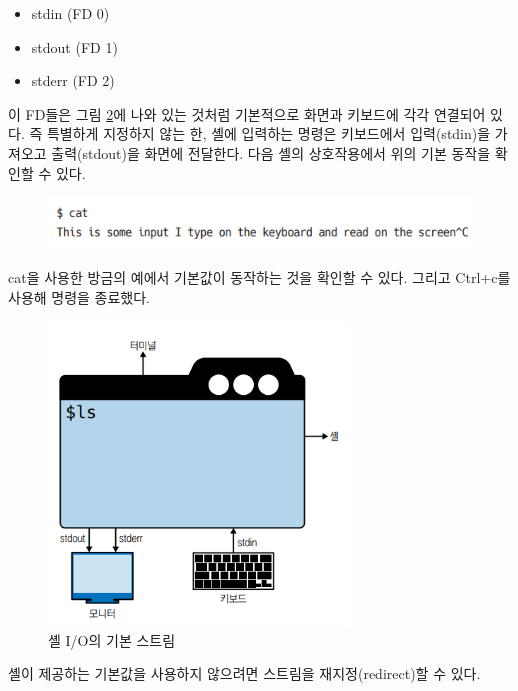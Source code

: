 \begin{itemize}
    \item stdin (FD 0)
    \item stdout (FD 1)
    \item stderr (FD 2)
\end{itemize}

\begin{flushleft}
    이 FD들은 그림 \ref{fig:stream}에 나와 있는 것처럼
    기본적으로 화면과 키보드에 각각 연결되어 있다.
    즉 특별하게 지정하지 않는 한,
    셸에 입력하는 명령은 키보드에서 입력(stdin)을 가져오고 출력(stdout)을 화면에 전달한다.
    다음 셸의 상호작용에서 위의 기본 동작을 확인할 수 있다.
\end{flushleft}

\begin{figure}[h]
    \includegraphics[width=15cm]{resource/3-stream-example}
    \label{fig:stream-example}
\end{figure}

\begin{flushleft}
    cat을 사용한 방금의 예에서 기본값이 동작하는 것을 확인할 수 있다.
    그리고 Ctrl+c를 사용해 명령을 종료했다.
\end{flushleft}

\begin{figure}[h]
    \centering
    \includegraphics[width=8cm]{resource/3-2}
    \caption{셸 I/O의 기본 스트림}
    \label{fig:stream}
\end{figure}

\begin{flushleft}
    셸이 제공하는 기본값을 사용하지 않으려면 스트림을 재지정(redirect)할 수 있다.
\end{flushleft}

